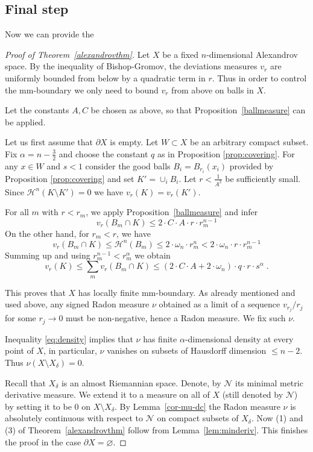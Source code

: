 \documentclass[12pt,leqno]{amsart}
\numberwithin{equation}{section}
\theoremstyle{definition}
\theoremstyle{remark}
\newcommand{\tref}[1]{Theorem~\ref{#1}}
\newcommand{\pref}[1]{Proposition~\ref{#1}}
\newcommand{\lref}[1]{Lemma~\ref{#1}}
\def\emptyset{\varnothing}
\begin{document}
\subsection{Final step}
Now we can provide the
\begin{proof}[Proof of Theorem~\ref{alexandrovthm}]
Let $X$ be a fixed $n$-dimensional Alexandrov space.   By the inequality of Bishop-Gromov,  the deviations measures $v_r$ are uniformly bounded from below
by a quadratic term in $r$. Thus  in order to control the mm-boundary  we only need to bound $v_r$ from above on balls in $X$.

 Let the constants $A,C$ be chosen as above, so that \pref{ballmeasure} can be applied.

Let us first assume that $\partial X$  is empty.
 Let $W\subset X$ be an arbitrary  compact subset. Fix $\alpha =n-\frac 3 2$ and choose the constant $q$ as in Proposition \ref{prop:covering}.
For any $x\in W$ and $s<1$ consider the  good  balls $B_i=B_{r_i} (x_i)$ provided by Proposition \ref{prop:covering} and set $K'=\cup _i B_i$. Let $r<\frac 1 {A^2}$ be sufficiently small.  Since $\mathcal H^n (K\setminus K')=0$
we have $ v_r (K)=v_r (K')$.





For all $m$ with $r<r_m$, we apply \pref{ballmeasure} and infer
$$v_r(B_m \cap K)\le 2\cdot  C\cdot A \cdot r\cdot r_m^{n-1} $$
On the other hand, for $r_m<r$, we have
$$v_r (B_m\cap K) \leq \mathcal H^n  (B_m) \leq 2 \cdot \omega _n  \cdot r_m ^n < 2\cdot \omega_n \cdot r \cdot r_m ^{n-1} $$
Summing up  and using $r_m^{n-1} < r_m ^{\alpha}$ we obtain
\begin{equation} \label{eq:density}
v_r (K) \leq \sum_m v_r (B_m \cap K) \leq (2\cdot C\cdot A+2\cdot \omega _n) \cdot q\cdot  r \cdot s^{\alpha} \; .
\end{equation}

This proves that $X$ has locally finite mm-boundary.  As already mentioned and used above, any  signed Radon measure $\nu$ obtained as a limit of a sequence $v_{r_j} /r_j$ for some $r_j\to 0$ must be non-negative, hence a Radon measure.    We fix such $\nu$.

Inequality \eqref{eq:density} implies that $\nu$ has finite $\alpha$-dimensional density at every point of $X$, in particular, $\nu$  vanishes on subsets of Hausdorff dimension $\leq n-2$.
  Thus $\nu (X \setminus X_{\delta } )=0$.

Recall that $X_{\delta}$ is an almost Riemannian space. Denote, by $\mathcal N $ its minimal metric derivative measure. We extend it to a measure on all of $X$ (still denoted by $\mathcal N $) by setting it to be $0$ on $X\setminus X_{\delta}$.
By \lref{cor-mu-dc} the Radon measure  $\nu$  is absolutely continuous with respect to  $\mathcal N $ on compact subsets of $X_{\delta}$.
  Now (1) and (3) of \tref{alexandrovthm} follow from \lref{lem:minderiv}.
 This finishes the proof in the case $\partial X=\emptyset$.




\end{proof}
\end{document}
